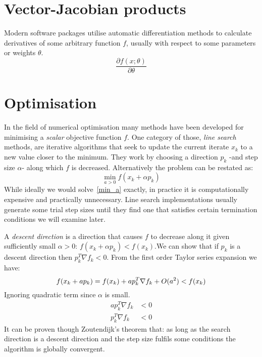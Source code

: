 \documentclass{article}
\begin{document}
    \section{Vector-Jacobian products}
    Modern software packages utilise automatic differentiation methods to calculate derivatives of some arbitrary function $f$, usually with respect to some parameters or weights $\theta$.
    \begin{equation}
        \frac{\partial f(x; \theta)}{ \partial \theta}
    \end{equation}


    \section{Optimisation}
    In the field of numerical optimisation many methods have been developed for minimising a \textit{scalar} objective function $f$.
    One category of those, \textit{line search} methods, are iterative algorithms that seek to update the current iterate $x_k$ to a new value closer to the minimum.
    They work by choosing a direction $p_k$ -and step size $\alpha$- along which $f$ is decreased.
    Alternatively the problem can be restated as:
    \begin{equation}
        \min_{a>0} f(x_k + \alpha p_k) \label{min_a}
    \end{equation}
    While ideally we would solve~\eqref{min_a} exactly, in practice it is computationally expensive and practically unnecessary.
    Line search implementations usually generate some trial step sizes until they find one that satisfies certain termination conditions we will examine later.

    A \textit{descent direction} is a direction that causes $f$ to decrease along it given sufficiently small $\alpha > 0$: $f(x_k + \alpha p_k) < f(x_k)$.We can show that if $p_k$ is a descent direction then $p_k^T \nabla f_k < 0$.
    From the first order Taylor series expansion we have:
    \begin{equation*}
        f(x_k+ap_k) = f(x_k) + a p_k^T \nabla f_k + O(a^2)< f(x_k) \\
    \end{equation*}
    Ignoring quadratic term since $\alpha$ is small.
    \begin{align*}
        a p_k^T \nabla f_k &< 0 \\
        p_k^T \nabla f_k &< 0
    \end{align*}
    It can be proven though Zoutendijk's theorem that: as long as the search direction is a descent direction and the step size fulfils some conditions the algorithm is globally convergent.
\end{document}

